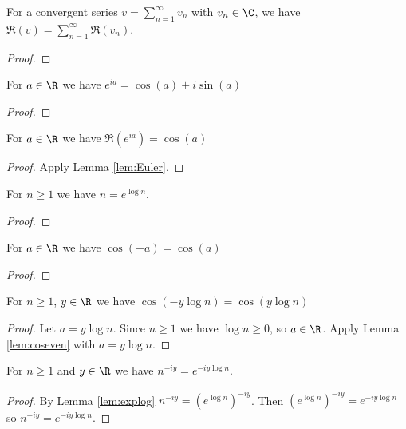 \begin{lemma}\label{lem:sumReal}  \leanok
For a convergent series $v=\sum_{n=1}^\infty v_n$ with $v_n\in\C$, we have $\Re(v) = \sum_{n=1}^\infty \Re(v_n)$.
\end{lemma}
\begin{proof} \leanok
\end{proof}



\begin{lemma} \label{lem:Euler}  \leanok
For $a\in\R$ we have $e^{ia} = \cos(a) + i\sin(a)$
\end{lemma}
\begin{proof} \leanok
\end{proof}

\begin{lemma}\label{lem:Reecos}  \leanok
For $a\in\R$ we have $\Re(e^{ia}) = \cos(a)$
\end{lemma}
\begin{proof} \leanok {}
Apply Lemma \ref{lem:Euler}.
\end{proof}

\begin{lemma}\label{lem:explog}  \leanok
For $n\ge1$ we have $n = e^{\log n}$.
\end{lemma}
\begin{proof} \leanok
\end{proof}

\begin{lemma}\label{lem:coseven}  \leanok
For $a\in\R$ we have $\cos(-a) = \cos(a)$
\end{lemma}
\begin{proof}
    \leanok
\end{proof}

\begin{lemma}\label{lem:coseveny}  \leanok
For $n\ge1$, $y\in\R$ we have $\cos(-y\log n) = \cos(y\log n)$
\end{lemma}
\begin{proof} \leanok {}
Let $a=y\log n$. Since $n\ge1$ we have $\log n\ge0$, so $a\in \R$.
Apply Lemma \ref{lem:coseven} with $a=y\log n$.
\end{proof}


\begin{lemma}\label{lem:niyelog}  \leanok
For $n\ge1$ and $y\in\R$ we have $n^{-iy} = e^{-iy\log n}$.
\end{lemma}
\begin{proof} \leanok {}
By Lemma \ref{lem:explog} $n^{-iy} = (e^{\log n})^{-iy}$. Then $(e^{\log n})^{-iy} = e^{-iy\log n}$ so $n^{-iy} = e^{-iy\log n}$.
\end{proof}

